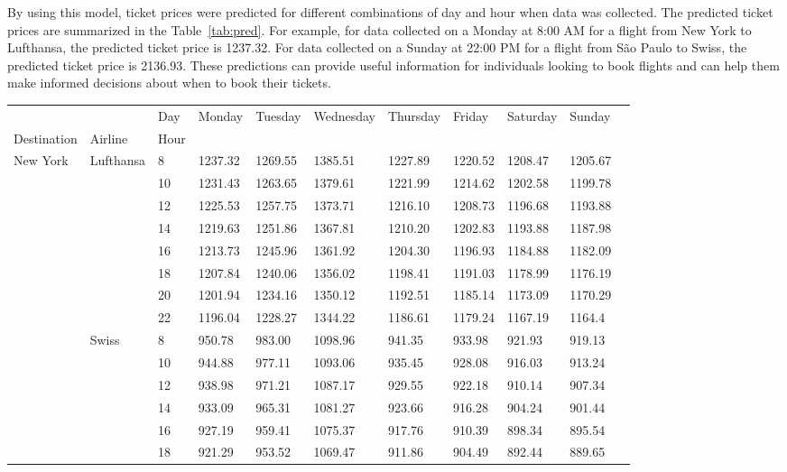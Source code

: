 By using this model, ticket prices were predicted for different combinations of day and hour when data was collected.
The predicted ticket prices are summarized in the Table~\ref{tab:pred}.
For example, for data collected on a Monday at 8:00 AM for a flight from New York to Lufthansa, the predicted ticket price is 1237.32.
For data collected on a Sunday at 22:00 PM for a flight from São Paulo to Swiss, the predicted ticket price is 2136.93.
These predictions can provide useful information for individuals looking to book flights and can help them make informed decisions about when to book their tickets.

\begin{table}[h!]
  \centering
  \begin{tabular}{l l l l l l l l l l l}
  & & Day & Monday & Tuesday & Wednesday & Thursday & Friday & Saturday & Sunday \\
  Destination & Airline & Hour & & & & & & & \\
  New York & Lufthansa & 8 & 1237.32 & 1269.55 & 1385.51 & 1227.89 & 1220.52 & 1208.47 & 1205.67 \\
  & & 10 & 1231.43 & 1263.65 & 1379.61 & 1221.99 & 1214.62 & 1202.58 & 1199.78\\
  & & 12 & 1225.53 & 1257.75 & 1373.71 & 1216.10 & 1208.73 &  1196.68 & 1193.88\\
  & & 14 & 1219.63 & 1251.86 & 1367.81 & 1210.20 & 1202.83 & 1193.88 & 1187.98\\
  & & 16 & 1213.73 & 1245.96 & 1361.92 & 1204.30 & 1196.93 & 1184.88 & 1182.09 \\
  & & 18 & 1207.84 & 1240.06 & 1356.02 & 1198.41 & 1191.03 & 1178.99 & 1176.19 \\
  & & 20 & 1201.94 & 1234.16 & 1350.12 & 1192.51 & 1185.14 & 1173.09 & 1170.29 \\
  & & 22 & 1196.04 & 1228.27 & 1344.22 & 1186.61 & 1179.24 & 1167.19 & 1164.4 \\
  & Swiss & 8 & 950.78 & 983.00 & 1098.96 & 941.35 & 933.98 & 921.93 & 919.13\\
  & & 10 & 944.88 & 977.11 & 1093.06 & 935.45 & 928.08 & 916.03 & 913.24\\
  & & 12 & 938.98 & 971.21 & 1087.17 & 929.55 & 922.18 & 910.14 & 907.34\\
  & & 14 & 933.09 & 965.31 & 1081.27 & 923.66 & 916.28 & 904.24 & 901.44\\
  & & 16 & 927.19 & 959.41 & 1075.37 & 917.76 & 910.39 & 898.34 & 895.54\\
  & & 18 & 921.29 & 953.52 & 1069.47 & 911.86 & 904.49 & 892.44 & 889.65\\

\end{tabular}
\end{table}
